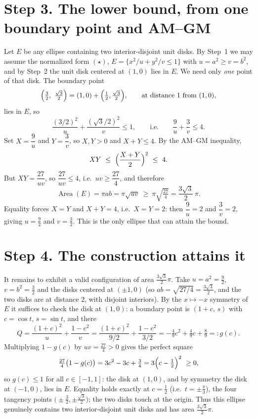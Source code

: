 \documentclass[11pt]{article}
\DeclareMathOperator{\Area}{Area}
\begin{document}
\section*{Step 3. The lower bound, from one boundary point and AM--GM}

Let $E$ be any ellipse containing two interior-disjoint unit disks. By Step~1 we may assume the
normalized form $(\star)$, $E=\{x^2/u+y^2/v\le1\}$ with $u=a^2\ge v=b^2$, and by Step~2 the unit disk
centered at $(1,0)$ lies in $E$. We need only \emph{one} point of that disk. The boundary point
\[
  \Bigl(\tfrac32,\ \tfrac{\sqrt3}{2}\Bigr)=(1,0)+\Bigl(\tfrac12,\tfrac{\sqrt3}{2}\Bigr),
  \qquad\text{at distance }1\text{ from }(1,0),
\]
lies in $E$, so
\[
  \frac{(3/2)^2}{u}+\frac{(\sqrt3/2)^2}{v}\le1,
  \qquad\text{i.e.}\qquad \frac{9}{u}+\frac{3}{v}\le4 .
\]
Set $X=\dfrac9u$ and $Y=\dfrac3v$, so $X,Y>0$ and $X+Y\le4$. By the AM--GM inequality,
\[
  XY\ \le\ \Bigl(\frac{X+Y}{2}\Bigr)^2\ \le\ 4 .
\]
But $XY=\dfrac{27}{uv}$, so $\dfrac{27}{uv}\le4$, i.e.\ $uv\ge\dfrac{27}{4}$, and therefore
\[
  \Area(E)=\pi ab=\pi\sqrt{uv}\ \ge\ \pi\sqrt{\tfrac{27}{4}}=\frac{3\sqrt3}{2}\,\pi .
\]
Equality forces $X=Y$ and $X+Y=4$, i.e.\ $X=Y=2$: then $\dfrac9u=2$ and $\dfrac3v=2$, giving
$u=\tfrac92$ and $v=\tfrac32$. This is the only ellipse that can attain the bound.

\section*{Step 4. The construction attains it}

It remains to exhibit a valid configuration of area $\tfrac{3\sqrt3}{2}\pi$. Take $u=a^2=\tfrac92$,
$v=b^2=\tfrac32$ and the disks centered at $(\pm1,0)$ (so $ab=\sqrt{27/4}=\tfrac{3\sqrt3}{2}$, and the
two disks are at distance $2$, with disjoint interiors). By the $x\mapsto-x$ symmetry of $E$ it
suffices to check the disk at $(1,0)$: a boundary point is $(1+c,\,s)$ with $c=\cos t$, $s=\sin t$,
and there
\[
  Q=\frac{(1+c)^2}{u}+\frac{1-c^2}{v}
   =\frac{(1+c)^2}{9/2}+\frac{1-c^2}{3/2}
   =-\tfrac49c^2+\tfrac49c+\tfrac89=:g(c).
\]
Multiplying $1-g(c)$ by $uv=\tfrac{27}{4}>0$ gives the perfect square
\[
  \tfrac{27}{4}\bigl(1-g(c)\bigr)=3c^2-3c+\tfrac34=3\Bigl(c-\tfrac12\Bigr)^2\ \ge0,
\]
so $g(c)\le1$ for all $c\in[-1,1]$: the disk at $(1,0)$, and by symmetry the disk at $(-1,0)$, lies
in $E$. Equality holds exactly at $c=\tfrac12$ (i.e.\ $t=\pm\tfrac\pi3$), the four tangency points
$\bigl(\pm\tfrac32,\pm\tfrac{\sqrt3}{2}\bigr)$; the two disks touch at the origin. Thus this ellipse
genuinely contains two interior-disjoint unit disks and has area $\tfrac{3\sqrt3}{2}\pi$.
\end{document}
